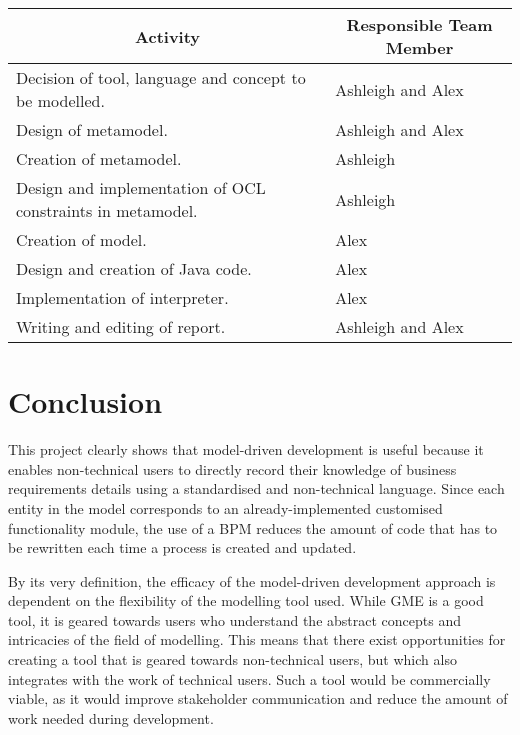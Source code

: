 \documentclass[11pt, a4paper, oneside, openright]{article}
\begin{document}
\begin{table}[H]
\begin{tabular}{|l|l|}
\hline
\multicolumn{1}{|c|}{\textbf{Activity}}                    & \multicolumn{1}{c|}{\textbf{Responsible Team Member}} \\
\hline
Decision of tool, language and concept to be modelled.     & Ashleigh and Alex                                    \\
\hline
Design of metamodel.                                       & Ashleigh and Alex                                    \\
\hline
Creation of metamodel.                                     & Ashleigh                                             \\
\hline
Design and implementation of OCL constraints in metamodel. & Ashleigh                                             \\
\hline
Creation of model.                                         & Alex                                                 \\
\hline
Design and creation of Java code.                          & Alex                                                 \\
\hline
Implementation of interpreter.                             & Alex                                                 \\
\hline
Writing and editing of report.                             & Ashleigh and Alex									  \\
\hline
\end{tabular}
\end{table}

\section{Conclusion}
This project clearly shows that model-driven development is useful because
it enables non-technical users to directly record their knowledge of business
requirements details using a standardised and non-technical language. Since each
entity in the model corresponds to an already-implemented customised
functionality module, the use of a BPM reduces the amount of code that has to be
rewritten each time a process is created and updated.

By its very definition, the efficacy of the model-driven development
approach is dependent on the flexibility of the modelling tool used. While
GME is a good tool, it is geared towards users who understand the abstract
concepts and intricacies of the field of modelling. This means that there
exist opportunities for creating a tool that is geared towards non-technical users,
but which also integrates with the work of technical users. Such a tool would be
commercially viable, as it would improve stakeholder communication and
reduce the amount of work needed during development.
\end{document}
